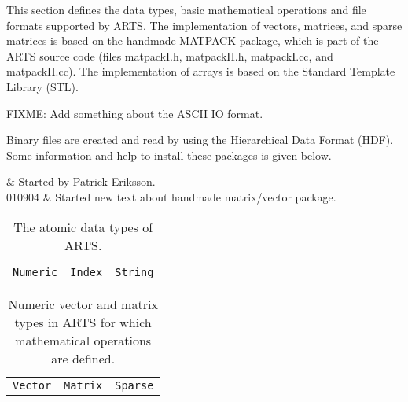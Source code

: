 %
%
 \label{sec:formats}
 
 This section defines the data types, basic mathematical operations
 and file formats supported by ARTS. The implementation of vectors,
 matrices, and sparse matrices is based on the handmade MATPACK
 package, which is part of the ARTS source code (files matpackI.h,
 matpackII.h, matpackI.cc, and matpackII.cc). The implementation of
 arrays is based on the Standard Template Library (STL).
 
 FIXME: Add something about the ASCII IO format.

 Binary files are created and read by using the Hierarchical Data
 Format (HDF). Some information and help to install these packages is
 given below.

%
%
 & Started by Patrick Eriksson. \\
  010904 & Started new text about handmade matrix/vector package.\\
\stophistory


 \label{sec:formats:datatypes}

 \begin{table}[t]
  \begin{tabular}{p{4cm} p{4cm} p{4cm}}
   \verb|Numeric|        & \verb|Index|         & \verb|String|         \\
  \end{tabular}
  \caption{The atomic data types of ARTS.}
  \label{table:format:atomic}
 \end{table}

 \begin{table}[t]
  \begin{tabular}{p{4cm} p{4cm} p{4cm}}
   \verb|Vector|         & \verb|Matrix|         & \verb|Sparse|    \\
  \end{tabular}
  \caption{Numeric vector and matrix types in ARTS for which mathematical 
           operations are defined.}
  \label{table:format:nummath}
 \end{table}

